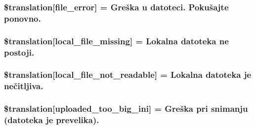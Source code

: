 \subsubsection[{\$translation}]{\setlength{\rightskip}{0pt plus 5cm}\$translation\mbox{[}\textquotesingle{}file\+\_\+error\textquotesingle{}\mbox{]} = \textquotesingle{}Greška u datoteci. Pokušajte ponovno.\textquotesingle{}}\label{class_8upload_8hr___h_r_8php_ac7498e49b9771b04698029aa61c70821}
\hypertarget{class_8upload_8hr___h_r_8php_a6ec3d3a47ab70d77e7aa593e82ead10e}{}
\subsubsection[{\$translation}]{\setlength{\rightskip}{0pt plus 5cm}\$translation\mbox{[}\textquotesingle{}local\+\_\+file\+\_\+missing\textquotesingle{}\mbox{]} = \textquotesingle{}Lokalna datoteka ne postoji.\textquotesingle{}}\label{class_8upload_8hr___h_r_8php_a6ec3d3a47ab70d77e7aa593e82ead10e}
\hypertarget{class_8upload_8hr___h_r_8php_a60104befef9b241f3a7a6a755618a4b3}{}
\subsubsection[{\$translation}]{\setlength{\rightskip}{0pt plus 5cm}\$translation\mbox{[}\textquotesingle{}local\+\_\+file\+\_\+not\+\_\+readable\textquotesingle{}\mbox{]} = \textquotesingle{}Lokalna datoteka je nečitljiva.\textquotesingle{}}\label{class_8upload_8hr___h_r_8php_a60104befef9b241f3a7a6a755618a4b3}
\hypertarget{class_8upload_8hr___h_r_8php_a6a08dcd0d3651fdd098568f6b2f0a42c}{}
\subsubsection[{\$translation}]{\setlength{\rightskip}{0pt plus 5cm}\$translation\mbox{[}\textquotesingle{}uploaded\+\_\+too\+\_\+big\+\_\+ini\textquotesingle{}\mbox{]} = \textquotesingle{}Greška pri snimanju (datoteka je prevelika).\textquotesingle{}}\label{class_8upload_8hr___h_r_8php_a6a08dcd0d3651fdd098568f6b2f0a42c}
\hypertarget{class_8upload_8hr___h_r_8php_a623d5b8b92169f57d7e43458aa911cbb}{}
